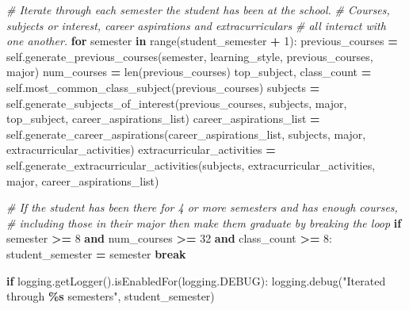 \documentclass[
  twocolumn]{article}
\newenvironment{Shaded}{\begin{snugshade}}{\end{snugshade}}
\newcommand{\BuiltInTok}[1]{#1}
\newcommand{\CommentTok}[1]{\textcolor[rgb]{0.56,0.35,0.01}{\textit{#1}}}
\newcommand{\ControlFlowTok}[1]{\textcolor[rgb]{0.13,0.29,0.53}{\textbf{#1}}}
\newcommand{\DecValTok}[1]{\textcolor[rgb]{0.00,0.00,0.81}{#1}}
\newcommand{\KeywordTok}[1]{\textcolor[rgb]{0.13,0.29,0.53}{\textbf{#1}}}
\newcommand{\NormalTok}[1]{#1}
\newcommand{\OperatorTok}[1]{\textcolor[rgb]{0.81,0.36,0.00}{\textbf{#1}}}
\newcommand{\SpecialCharTok}[1]{\textcolor[rgb]{0.81,0.36,0.00}{\textbf{#1}}}
\newcommand{\StringTok}[1]{\textcolor[rgb]{0.31,0.60,0.02}{#1}}
\newcommand{\VariableTok}[1]{\textcolor[rgb]{0.00,0.00,0.00}{#1}}
\begin{document}
\begin{Shaded}
\begin{Highlighting}[]
            \CommentTok{\# Iterate through each semester the student has been at the school.}
            \CommentTok{\# Courses, subjects or interest, career aspirations and extracurriculars}
            \CommentTok{\# all interact with one another.}
            \ControlFlowTok{for}\NormalTok{ semester }\KeywordTok{in} \BuiltInTok{range}\NormalTok{(student\_semester }\OperatorTok{+} \DecValTok{1}\NormalTok{):}
\NormalTok{                previous\_courses }\OperatorTok{=} \VariableTok{self}\NormalTok{.generate\_previous\_courses(semester, learning\_style, previous\_courses, major)}
\NormalTok{                num\_courses }\OperatorTok{=} \BuiltInTok{len}\NormalTok{(previous\_courses)}
\NormalTok{                top\_subject, class\_count }\OperatorTok{=} \VariableTok{self}\NormalTok{.most\_common\_class\_subject(previous\_courses)}
\NormalTok{                subjects }\OperatorTok{=} \VariableTok{self}\NormalTok{.generate\_subjects\_of\_interest(previous\_courses, subjects, major, top\_subject, career\_aspirations\_list)}
\NormalTok{                career\_aspirations\_list }\OperatorTok{=} \VariableTok{self}\NormalTok{.generate\_career\_aspirations(career\_aspirations\_list, subjects, major, extracurricular\_activities)}
\NormalTok{                extracurricular\_activities }\OperatorTok{=} \VariableTok{self}\NormalTok{.generate\_extracurricular\_activities(subjects, extracurricular\_activities, major, career\_aspirations\_list)}

                \CommentTok{\# If the student has been there for 4 or more semesters and has enough courses,}
                \CommentTok{\# including those in their major then make them graduate by breaking the loop}
                \ControlFlowTok{if}\NormalTok{ semester }\OperatorTok{\textgreater{}=} \DecValTok{8} \KeywordTok{and}\NormalTok{ num\_courses }\OperatorTok{\textgreater{}=} \DecValTok{32} \KeywordTok{and}\NormalTok{ class\_count }\OperatorTok{\textgreater{}=} \DecValTok{8}\NormalTok{:}
\NormalTok{                    student\_semester }\OperatorTok{=}\NormalTok{ semester}
                    \ControlFlowTok{break}

            \ControlFlowTok{if}\NormalTok{ logging.getLogger().isEnabledFor(logging.DEBUG):}
\NormalTok{                logging.debug(}\StringTok{"Iterated through }\SpecialCharTok{\%s}\StringTok{ semesters"}\NormalTok{, student\_semester)}


\end{Highlighting}
\end{Shaded}
\end{document}

